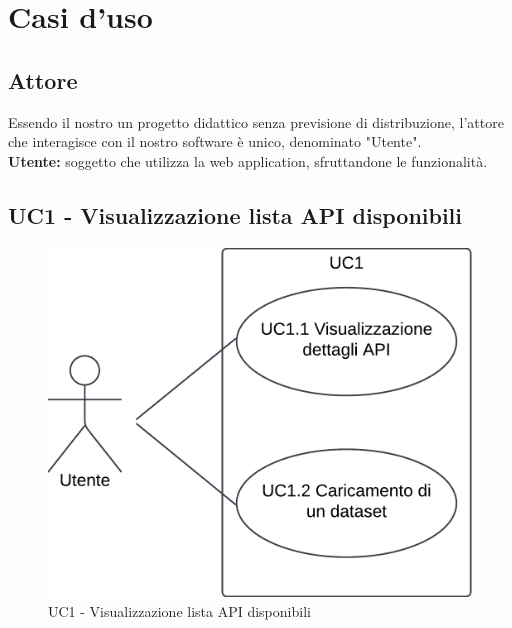 \section{Casi d'uso}
\subsection{Attore}
Essendo il nostro un progetto didattico senza previsione di distribuzione, l'attore che interagisce con il nostro software è unico, denominato "Utente".\\
\textbf{Utente:} soggetto che utilizza la web application, sfruttandone le funzionalità.
\subsection{UC1 - Visualizzazione lista API disponibili}
\begin{figure}[h!]
    \centering
    \includegraphics[scale=0.7]{template/images/UC1_1.1_1.2.png}
    \caption{UC1 - Visualizzazione lista API disponibili}
\end{figure}
